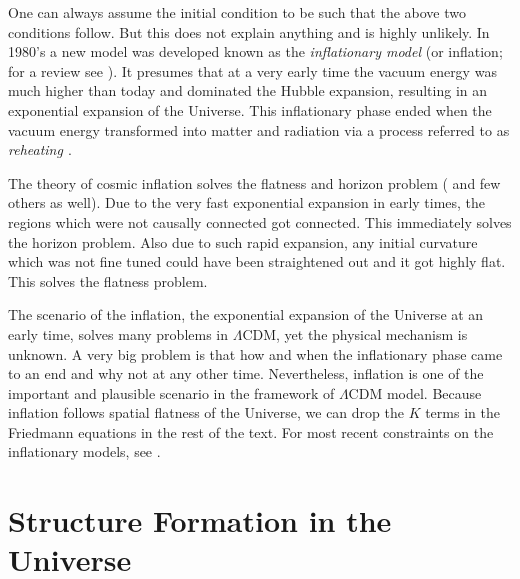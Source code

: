 \documentclass[
  11pt,
  twoside,
  openright,
  titlepage,
  headings=optiontoheadandtoc
]{scrbook}
\begin{document}
One can always assume the initial condition to be such that the above two conditions
follow. But this does not explain anything and is highly unlikely. In 1980's 
a new model was developed known as the {\it inflationary model} (or inflation;
for a review see \cite{2001hep.ph....1119B,2003hep.ph....4257T,2006RvMP...78..537B}). It presumes
that at a very early time the vacuum energy was much higher than today and dominated
the Hubble expansion, resulting in an exponential expansion of the Universe. This 
inflationary phase ended when the vacuum energy transformed into
matter and radiation via a process referred to as {\it reheating \citep{2006RvMP...78..537B}}.

The theory of cosmic inflation solves the flatness and horizon problem (
and few others as well). Due to the very fast exponential expansion in early times, the
regions which were not causally connected got connected. This immediately solves
the horizon problem. Also due to such rapid expansion, any initial curvature which
was not fine tuned could have been straightened out and it got highly flat. This solves the
flatness problem. 

The scenario of the inflation, the exponential expansion of the Universe at 
an early time, solves many problems in $\Lambda$CDM, yet the physical mechanism
is unknown. A very big problem is that how and when the inflationary phase came
to an end and why not at any other time. Nevertheless, inflation is one of the
important and plausible scenario in the framework of $\Lambda$CDM model. Because
inflation follows spatial flatness  of the Universe, 
we can drop the $K$ terms in the Friedmann
equations in the rest of the text. For most recent constraints on 
the inflationary models, see \cite{2015arXiv150202114P}.

\section{Structure Formation in the Universe}
\end{document}
